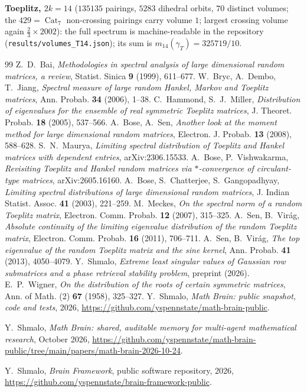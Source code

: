 ﻿\documentclass[11pt]{article}
\theoremstyle{remark}
\newcommand{\Cat}{\operatorname{Cat}}
\newcommand{\gT}{\gamma_T}
\begin{document}
\medskip
\noindent\textbf{Toeplitz, $2k=14$} ($135135$ pairings, $5283$ dihedral orbits, $70$
distinct volumes; the $429=\Cat_7$ non-crossing pairings carry volume $1$; largest
crossing volume again $\tfrac23\times2002$): the full spectrum is machine-readable in
the repository (\texttt{results/volumes\_T14.json}); its sum is
$m_{14}(\gT)=325719/10$.

\begin{thebibliography}{99}
 Z.~D.~Bai,
\emph{Methodologies in spectral analysis of large dimensional random matrices, a review},
Statist. Sinica \textbf{9} (1999), 611--677.
 W.~Bryc, A.~Dembo, T.~Jiang,
\emph{Spectral measure of large random Hankel, Markov and Toeplitz matrices},
Ann. Probab. \textbf{34} (2006), 1--38.
 C.~Hammond, S.~J.~Miller,
\emph{Distribution of eigenvalues for the ensemble of real symmetric Toeplitz
matrices}, J. Theoret. Probab. \textbf{18} (2005), 537--566.
 A.~Bose, A.~Sen,
\emph{Another look at the moment method for large dimensional random matrices},
Electron. J. Probab. \textbf{13} (2008), 588--628.
 S.~N.~Maurya, \emph{Limiting spectral distribution of Toeplitz and
Hankel matrices with dependent entries}, arXiv:2306.15533.
 A.~Bose, P.~Vishwakarma, \emph{Revisiting Toeplitz and Hankel
random matrices via $*$-convergence of circulant-type matrices}, arXiv:2605.16160.
 A.~Bose, S.~Chatterjee, S.~Gangopadhyay,
\emph{Limiting spectral distributions of large dimensional random matrices},
J. Indian Statist. Assoc. \textbf{41} (2003), 221--259.
 M.~Meckes, \emph{On the spectral norm of a random Toeplitz matrix},
Electron. Comm. Probab. \textbf{12} (2007), 315--325.
 A.~Sen, B.~Vir\'ag, \emph{Absolute continuity of the limiting eigenvalue
distribution of the random Toeplitz matrix}, Electron. Comm. Probab. \textbf{16}
(2011), 706--711.
 A.~Sen, B.~Vir\'ag, \emph{The top eigenvalue of the random Toeplitz
matrix and the sine kernel}, Ann. Probab. \textbf{41} (2013), 4050--4079.
 Y.~Shmalo, \emph{Extreme least singular values of Gaussian row
submatrices and a phase retrieval stability problem}, preprint (2026).
 E.~P.~Wigner,
\emph{On the distribution of the roots of certain symmetric matrices},
Ann. of Math. (2) \textbf{67} (1958), 325--327.
 Y.~Shmalo, \emph{Math Brain: public snapshot, code and tests}, 2026, \url{https://github.com/yspennstate/math-brain-public}.

 Y.~Shmalo, \emph{Math Brain: shared, auditable memory for multi-agent mathematical research}, October 2026, \url{https://github.com/yspennstate/math-brain-public/tree/main/papers/math-brain-2026-10-24}.

 Y.~Shmalo, \emph{Brain Framework}, public software repository, 2026, \url{https://github.com/yspennstate/brain-framework-public}.

\end{thebibliography}
\end{document}
